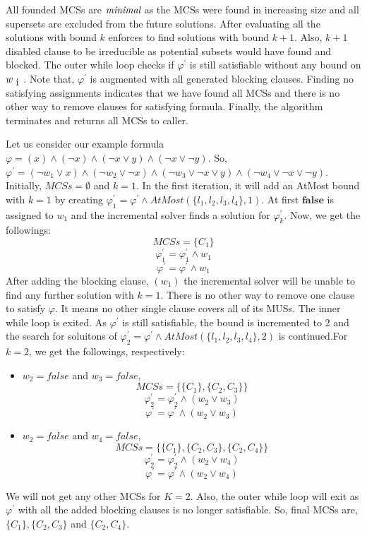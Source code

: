 All founded MCSs are $\emph{minimal}$ as the MCSs were found in increasing size and all supersets are excluded from the future solutions. After evaluating all the solutions with bound $k$ enforces to find solutions with bound $k+1$. Also, $k+1$ disabled clause to be irreducible as potential subsets would have found and blocked.\newline
The outer while loop checks if $\varphi^{\prime}$ is still satisfiable without any bound on $w_{\text i}$. Note that, $\varphi^{\prime}$ is augmented with all  generated blocking clauses. Finding no satisfying assignments indicates that we have found all MCSs and there is no other way to remove clauses for satisfying formula. Finally, the algorithm terminates and returns all MCSs to caller.
\begin{example}
Let us consider our example formula $\varphi=(x)\wedge(\neg x)\wedge(\neg x\vee y)\wedge(\neg x \vee \neg y)$. So, $\varphi^{\prime}=(\neg w_{1}\vee x)\wedge(\neg w_{2}\vee \neg x)\wedge(\neg w_{3}\vee \neg x\vee y)\wedge(\neg w_{4}\vee \neg x \vee \neg y)$. Initially, $MCSs=\emptyset$ and $k=1$.\newline
In the first iteration, it will add an AtMost bound with $k=1$ by creating $\varphi^{\prime}_{1}=\varphi^{\prime} \wedge AtMost(\{l_{1},l_{2},l_{3},l_{4}\},1)$. At first $\mathbf{false}$ is assigned to $w_{1}$ and the incremental solver finds a solution for $\varphi^{\prime}_{k}$. Now, we get the followings:
$$MCSs=\{C_{1}\}$$
$$\varphi^{\prime}_{1}=\varphi^{\prime}_{1} \wedge w_{1}$$
$$\varphi^{\prime}=\varphi^{\prime} \wedge w_{1}$$
After adding the blocking clause, $(w_{1})$ the incremental solver will be unable to find any further solution with $k=1$. There is no other way to remove one clause to satisfy $\varphi$. It means no other single clause covers all of its MUSs. The inner while loop is exited.\newline
As $\varphi^{\prime}$ is still satisfiable, the bound is incremented to 2 and the search for soluitons of $\varphi^{\prime}_{2}=\varphi^{\prime} \wedge AtMost(\{l_{1},l_{2},l_{3},l_{4}\},2)$ is continued.For $k=2$, we get the followings, respectively:
\begin{itemize}
	\item $w_{2}=false$ and $w_{3}=false,$
	$$MCSs=\{\{C_{1}\}, \{C_{2}, C_{3}\}\}$$
	$$\varphi^{\prime}_{2}=\varphi^{\prime}_{2} \wedge (w_{2}\vee w_{3})$$
	$$\varphi^{\prime}=\varphi^{\prime} \wedge (w_{2}\vee w_{3})$$
	\item $w_{2}=false$ and $w_{4}=false,$
	$$MCSs=\{\{C_{1}\}, \{C_{2}, C_{3}\}, \{C_{2}, C_{4}\}\}$$
	$$\varphi^{\prime}_{2}=\varphi^{\prime}_{2} \wedge (w_{2}\vee w_{4})$$
	$$\varphi^{\prime}=\varphi^{\prime} \wedge (w_{2}\vee w_{4})$$
\end{itemize}
We will not get any other MCSs for $K=2$. Also, the outer while loop will exit as $\varphi^{\prime}$ with all the added blocking clauses is no longer satisfiable. So, final MCSs are, $\{C_{1}\}, \{C_{2}, C_{3}\}$ and $\{C_{2}, C_{4}\}$.
\end{example}
